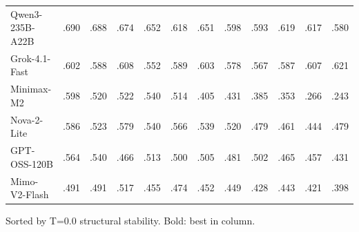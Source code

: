 \documentclass{article}
\theoremstyle{plain}
\theoremstyle{definition}
\begin{document}
\begin{table}[t]
\begin{tabular}{@{}lccccccccccc@{}}
Qwen3-235B-A22B & .690 & .688 & .674 & .652 & .618 & .651 & .598 & .593 & .619 & .617 & .580 \\
Grok-4.1-Fast & .602 & .588 & .608 & .552 & .589 & .603 & .578 & .567 & .587 & .607 & .621 \\
Minimax-M2 & .598 & .520 & .522 & .540 & .514 & .405 & .431 & .385 & .353 & .266 & .243 \\
Nova-2-Lite & .586 & .523 & .579 & .540 & .566 & .539 & .520 & .479 & .461 & .444 & .479 \\
GPT-OSS-120B & .564 & .540 & .466 & .513 & .500 & .505 & .481 & .502 & .465 & .457 & .431 \\
Mimo-V2-Flash & .491 & .491 & .517 & .455 & .474 & .452 & .449 & .428 & .443 & .421 & .398 \\
\bottomrule
\end{tabular}

\vspace{0.5em}
\raggedright\small Sorted by T=0.0 structural stability. Bold: best in column.
\end{table}
\end{document}
